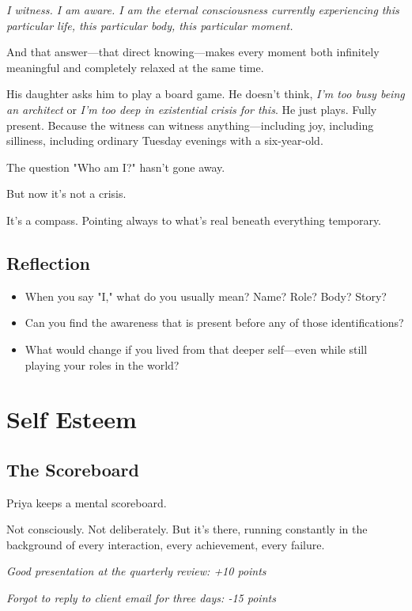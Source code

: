 \documentclass[11pt,twoside]{book}
\begin{document}
\emph{I witness. I am aware. I am the eternal consciousness currently experiencing this particular life, this particular body, this particular moment.}

And that answer—that direct knowing—makes every moment both infinitely meaningful and completely relaxed at the same time.

His daughter asks him to play a board game. He doesn't think, \emph{I'm too busy being an architect} or \emph{I'm too deep in existential crisis for this}. He just plays. Fully present. Because the witness can witness anything—including joy, including silliness, including ordinary Tuesday evenings with a six-year-old.

The question "Who am I?" hasn't gone away.

But now it's not a crisis.

It's a compass. Pointing always to what's real beneath everything temporary.

\section*{Reflection}

\begin{itemize}
\item When you say "I," what do you usually mean? Name? Role? Body? Story?
\item Can you find the awareness that is present before any of those identifications?
\item What would change if you lived from that deeper self—even while still playing your roles in the world?
\end{itemize}

\chapter{Self Esteem}

\section*{The Scoreboard}

Priya keeps a mental scoreboard.

Not consciously. Not deliberately. But it's there, running constantly in the background of every interaction, every achievement, every failure.

\emph{Good presentation at the quarterly review: +10 points}

\emph{Forgot to reply to client email for three days: -15 points}
\end{document}
